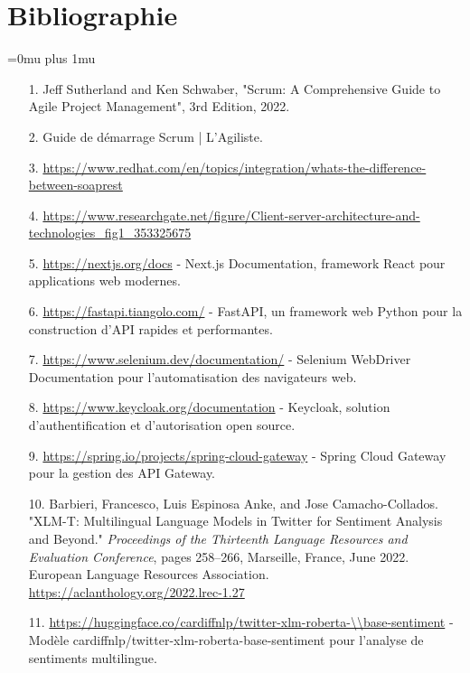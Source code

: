 \chapter*{Bibliographie}

\def\UrlBreaks{\do\/\do-\do.\do=\do_}
\Urlmuskip=0mu plus 1mu

\begin{itemize}[leftmargin=1cm, itemsep=0.3em, parsep=0.2em]
    \item[1.] Jeff Sutherland and Ken Schwaber, "Scrum: A Comprehensive Guide to Agile Project Management", 3rd Edition, 2022.
    \item[2.] Guide de démarrage Scrum | L'Agiliste.
    \item[3.] \url{https://www.redhat.com/en/topics/integration/whats-the-difference-between-soaprest}
    \item[4.] \url{https://www.researchgate.net/figure/Client-server-architecture-and-technologies_fig1_353325675}
    \item[5.] \url{https://nextjs.org/docs} - Next.js Documentation, framework React pour applications web modernes.
    \item[6.] \url{https://fastapi.tiangolo.com/} - FastAPI, un framework web Python pour la construction d'API rapides et performantes.
    \item[7.] \url{https://www.selenium.dev/documentation/} - Selenium WebDriver Documentation pour l'automatisation des navigateurs web.
    \item[8.] \url{https://www.keycloak.org/documentation} - Keycloak, solution d'authentification et d'autorisation open source.
    \item[9.] \url{https://spring.io/projects/spring-cloud-gateway} - Spring Cloud Gateway pour la gestion des API Gateway.
    \item[10.] Barbieri, Francesco, Luis Espinosa Anke, and Jose Camacho-Collados. "XLM-T: Multilingual Language Models in Twitter for Sentiment Analysis and Beyond." \textit{Proceedings of the Thirteenth Language Resources and Evaluation Conference}, pages 258--266, Marseille, France, June 2022. European Language Resources Association. \url{https://aclanthology.org/2022.lrec-1.27}
    \item[11.] \url{https://huggingface.co/cardiffnlp/twitter-xlm-roberta-\\base-sentiment} - Modèle cardiffnlp/twitter-xlm-roberta-base-sentiment pour l'analyse de sentiments multilingue.

\end{itemize}
